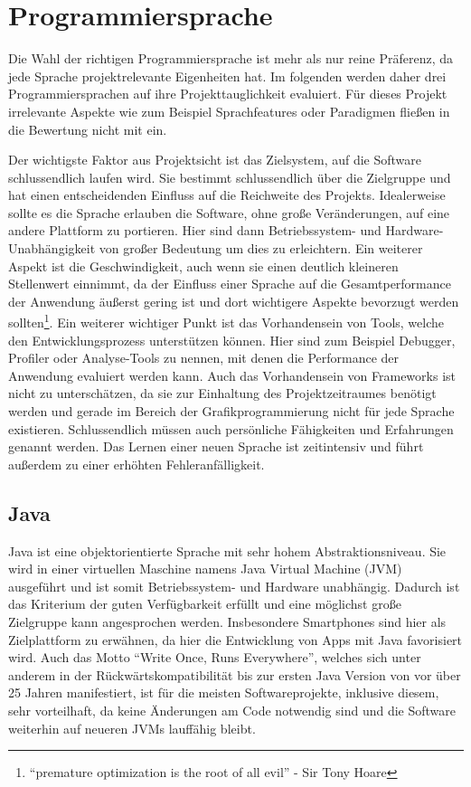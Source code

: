 \section{Programmiersprache}
Die Wahl der richtigen Programmiersprache ist mehr als nur reine Präferenz, da jede Sprache projektrelevante Eigenheiten hat. Im folgenden werden daher drei Programmiersprachen auf ihre Projekttauglichkeit evaluiert. Für dieses Projekt irrelevante Aspekte wie zum Beispiel Sprachfeatures oder Paradigmen fließen in die Bewertung nicht mit ein.

Der wichtigste Faktor aus Projektsicht ist das Zielsystem, auf die Software schlussendlich laufen wird. Sie bestimmt schlussendlich über die Zielgruppe und hat einen entscheidenden Einfluss auf die Reichweite des Projekts. Idealerweise sollte es die Sprache erlauben die Software, ohne große Veränderungen, auf eine andere Plattform zu portieren. Hier sind dann Betriebssystem- und Hardware-Unabhängigkeit von großer Bedeutung um dies zu erleichtern. Ein weiterer Aspekt ist die Geschwindigkeit, auch wenn sie einen deutlich kleineren Stellenwert einnimmt, da der Einfluss einer Sprache auf die Gesamtperformance der Anwendung äußerst gering ist und dort wichtigere Aspekte bevorzugt werden sollten\footnote{“premature optimization is the root of all evil” - Sir Tony Hoare}. Ein weiterer wichtiger Punkt ist das Vorhandensein von Tools, welche den Entwicklungsprozess unterstützen können. Hier sind zum Beispiel Debugger, Profiler oder Analyse-Tools zu nennen, mit denen die Performance der Anwendung evaluiert werden kann. Auch das Vorhandensein von Frameworks ist nicht zu unterschätzen, da sie zur Einhaltung des Projektzeitraumes benötigt werden und gerade im Bereich der Grafikprogrammierung nicht für jede Sprache existieren. Schlussendlich müssen auch persönliche Fähigkeiten und Erfahrungen genannt werden. Das Lernen einer neuen Sprache ist zeitintensiv und führt außerdem zu einer erhöhten Fehleranfälligkeit.

\subsection{Java}
Java ist eine objektorientierte Sprache mit sehr hohem Abstraktionsniveau. Sie wird in einer virtuellen Maschine namens Java Virtual Machine (JVM) ausgeführt und ist somit Betriebssystem- und Hardware unabhängig. Dadurch ist das Kriterium der guten Verfügbarkeit erfüllt und eine möglichst große Zielgruppe kann angesprochen werden. Insbesondere Smartphones sind hier als Zielplattform zu erwähnen, da hier die Entwicklung von Apps mit Java favorisiert wird. Auch das Motto “Write Once, Runs Everywhere”, welches sich unter anderem in der Rückwärtskompatibilität bis zur ersten Java Version von vor über 25 Jahren manifestiert, ist für die meisten Softwareprojekte, inklusive diesem, sehr vorteilhaft, da keine Änderungen am Code notwendig sind und die Software weiterhin auf neueren JVMs lauffähig bleibt.

